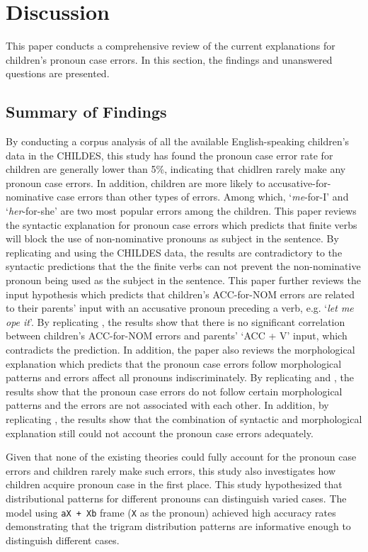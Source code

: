 \section{Discussion}
This paper conducts a comprehensive review of the current explanations for children's pronoun case errors. In this section, the findings and unanswered questions are presented. 
\subsection{Summary of Findings}
By conducting a corpus analysis of all the available English-speaking children's data in the CHILDES, this study has found the pronoun case error rate for children are generally lower than 5\%, indicating that chidlren rarely make any pronoun case errors. In addition, children are more likely to accusative-for-nominative case errors than other types of errors. Among which, `\textit{me}-for-I' and `\textit{her}-for-she' are two most popular errors among the children. This paper reviews the syntactic explanation for pronoun case errors  which predicts that finite verbs will block the use of non-nominative pronouns as subject in the sentence. By replicating \cite{schutze1996subject} and \cite{schutze1997} using the CHILDES data, the results are contradictory to the syntactic predictions that the the finite verbs can not prevent the non-nominative pronoun being used as the subject in the sentence. This paper further reviews the input hypothesis which predicts that children's ACC-for-NOM errors are related to their parents' input with an accusative pronoun preceding a verb, e.g. `\textit{let me ope it}'. By replicating \cite{kirjavainen2009can}, the results show that there is no significant correlation between children's ACC-for-NOM errors and parents' `ACC + V' input, which contradicts the prediction. In addition, the paper also reviews the morphological explanation which predicts that the pronoun case errors follow morphological patterns and errors affect all pronouns indiscriminately. By replicating \cite{rispoli1994,rispoli1998patterns} and \cite{fitzgerald2017case}, the results show that the pronoun case errors do not follow certain morphological patterns and the errors are not associated with each other. In addition, by replicating \cite{rispoli2005}, the results show that the combination of syntactic and morphological explanation still could not account the pronoun case errors adequately. 

Given that none of the existing theories could fully account for the pronoun case errors and children rarely make such errors, this study also investigates how children acquire pronoun case in the first place. This study hypothesized that distributional patterns for different pronouns can distinguish varied cases. The model using \texttt{aX + Xb} frame (\texttt{X} as the pronoun) achieved high accuracy rates demonstrating that the trigram distribution patterns are informative enough to distinguish different cases.



